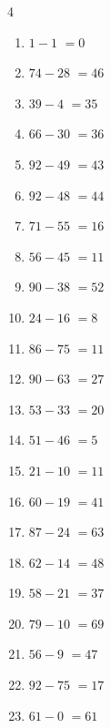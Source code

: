 \begin{multicols}{4}
\begin{enumerate}
  \item $1-1$
        $=0$

  \item $74-28$
        $=46$

  \item $39-4$
        $=35$

  \item $66-30$
        $=36$

  \item $92-49$
        $=43$

  \item $92-48$
        $=44$

  \item $71-55$
        $=16$

  \item $56-45$
        $=11$

  \item $90-38$
        $=52$

\columnbreak %

  \item $24-16$
        $=8$

  \item $86-75$
        $=11$

  \item $90-63$
        $=27$

  \item $53-33$
        $=20$

  \item $51-46$
        $=5$

  \item $21-10$
        $=11$

  \item $60-19$
        $=41$

  \item $87-24$
        $=63$

  \item $62-14$
        $=48$

  \item $58-21$
        $=37$

  \item $79-10$
        $=69$

  \item $56-9$
        $=47$

  \item $92-75$
        $=17$

  \item $61-0$
        $=61$


\end{enumerate}
\end{multicols}
